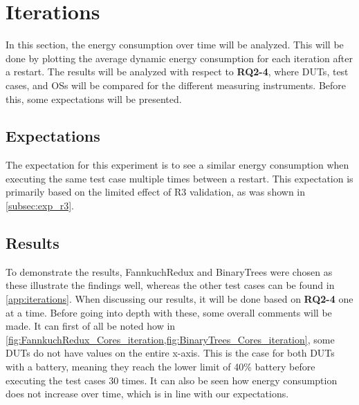 \section{Iterations}\label{sec:iterations}

In this section, the energy consumption over time will be analyzed. This will be done by plotting the average dynamic energy consumption for each iteration after a restart. The results will be analyzed with respect to \textbf{RQ2-4}, where DUTs, test cases, and OSs will be compared for the different measuring instruments. Before this, some expectations will be presented.

\subsection{Expectations}

The expectation for this experiment is to see a similar energy consumption when executing the same test case multiple times between a restart. This expectation is primarily based on the limited effect of R3 validation, as was shown in \cref{subsec:exp_r3}.

\subsection{Results}

To demonstrate the results, FannkuchRedux and BinaryTrees were chosen as these illustrate the findings well, whereas the other test cases can be found in \cref{app:iterations}. When discussing our results, it will be done based on \textbf{RQ2-4} one at a time. Before going into depth with these, some overall comments will be made. It can first of all be noted how in \cref{fig:FannkuchRedux_Cores_iteration,fig:BinaryTrees_Cores_iteration}, some DUTs do not have values on the entire x-axis. This is the case for both DUTs with a battery, meaning they reach the lower limit of 40\% battery before executing the test cases 30 times. It can also be seen how energy consumption does not increase over time, which is in line with our expectations. 




